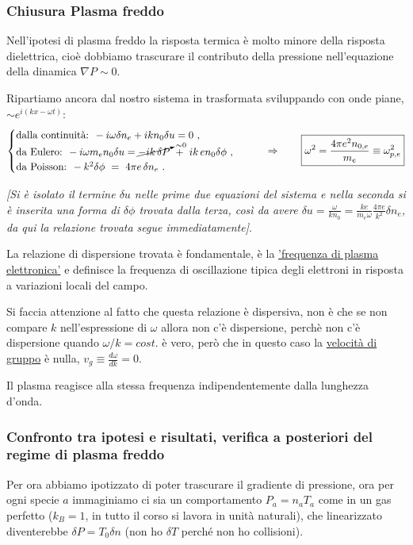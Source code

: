 %
%
%
\vspace{0.4cm}
\subsubsection{Chiusura Plasma freddo} 
Nell'ipotesi di plasma freddo la risposta termica è molto minore della risposta dielettrica, cioè dobbiamo trascurare il contributo della pressione nell'equazione della dinamica $\nabla P\sim0$.

Ripartiamo ancora dal nostro sistema in trasformata sviluppando con onde piane, $\sim e^{i(kx-\omega t)}$: 
\[\begin{cases}
	\text{dalla continuità: }-i\omega\delta n_e+ikn_0\delta u=0\ ,\\
	\text{da Eulero: }-i\omega m_en_0\delta u= \cancelto{\sim 0}{-ik\,\delta P}\ +\ ik\,en_0\delta \phi\ , \\
	\text{da Poisson: }-k^2\delta \phi\ =\ 4\pi e\,\delta n_e\ .
\end{cases}
\quad \quad \Rightarrow \quad \quad \boxed{\omega^2=\frac{4\pi e^2 n_{0, e}}{m_e} \equiv  \omega^2_{p,e}}
\]

\emph{[Si è isolato il termine $\delta u$ nelle prime due equazioni del sistema e nella seconda si è inserita una forma di $\delta \phi$ trovata dalla terza, così da avere $\delta u=\frac{\omega}{kn_0}=\frac{ke}{m_e \omega}\frac{4\pi e}{k^2}\delta n_e$, da qui la relazione trovata segue immediatamente]}.

La relazione di dispersione trovata è fondamentale, è la \underline{'frequenza di plasma elettronica'} e definisce la frequenza di oscillazione tipica degli elettroni in risposta a variazioni locali del campo. 

Si faccia attenzione al fatto che questa relazione è dispersiva, non è che se non compare $k$ nell'espressione di $\omega$ allora non c'è dispersione, perchè non c'è dispersione quando $\omega/k=cost$. è vero, però che in questo caso la \underline{velocità di gruppo} è nulla, $\boxed{v_g\equiv \frac{d\omega}{d k}}=0$.

Il plasma reagisce alla stessa frequenza indipendentemente dalla lunghezza d'onda. 

\vspace{0.4cm}
\subsubsection{Confronto tra ipotesi e risultati, verifica a posteriori del regime di plasma freddo} 
Per ora abbiamo ipotizzato di poter trascurare il gradiente di pressione, ora per ogni specie $a$ immaginiamo ci sia un comportamento  $P_a=n_aT_a$ come in un gas perfetto ($k_B =1$, in tutto il corso si lavora in unità naturali), che linearizzato diventerebbe $\boxed{\delta P=T_0\delta n}$ (non ho $\delta T$ perché non ho collisioni).

